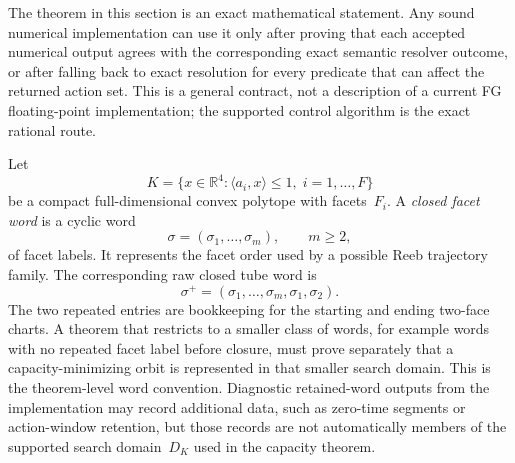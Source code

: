 The theorem in this section is an exact mathematical statement.  Any sound
numerical implementation can use it only after proving that each accepted
numerical output agrees with the corresponding exact semantic resolver outcome,
or after falling back to exact resolution for every predicate that can affect
the returned action set.  This is a general contract, not a description of a
current FG floating-point implementation; the supported control algorithm is
the exact rational route.

\begin{unverified}
\begin{definition}\label{def:flow-graph-closed-word}
Let
\[
  K = \{x \in \mathbb{R}^4 :
    \langle a_i, x \rangle \leq 1,\; i = 1,\ldots,F\}
\]
be a compact full-dimensional convex polytope with facets~$F_i$.
A \emph{closed facet word} is a cyclic word
\[
  \sigma = (\sigma_1,\ldots,\sigma_m),
  \qquad m \geq 2,
\]
of facet labels.  It represents the facet order used by a possible Reeb
trajectory family.  The corresponding raw closed tube word is
\[
  \sigma^+ = (\sigma_1,\ldots,\sigma_m,\sigma_1,\sigma_2).
\]
The two repeated entries are bookkeeping for the starting and ending two-face
charts.  A theorem that restricts to a smaller class of words, for example
words with no repeated facet label before closure, must prove separately that a
capacity-minimizing orbit is represented in that smaller search domain.  This
is the theorem-level word convention.  Diagnostic retained-word outputs from
the implementation may record additional data, such as zero-time segments or
action-window retention, but those records are not automatically members of the
supported search domain~$D_K$ used in the capacity theorem.
\end{definition}
\end{unverified}

